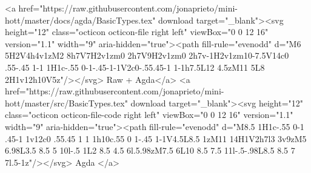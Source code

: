         <a href="https://raw.githubusercontent.com/jonaprieto/mini-hott/master/docs/agda/BasicTypes.tex" download target="_blank"><svg height="12" class="octicon octicon-file right left" viewBox="0 0 12 16" version="1.1" width="9" aria-hidden="true"><path fill-rule="evenodd" d="M6 5H2V4h4v1zM2 8h7V7H2v1zm0 2h7V9H2v1zm0 2h7v-1H2v1zm10-7.5V14c0 .55-.45 1-1 1H1c-.55 0-1-.45-1-1V2c0-.55.45-1 1-1h7.5L12 4.5zM11 5L8 2H1v12h10V5z"/></svg> Raw + Agda</a>
        <a href="https://raw.githubusercontent.com/jonaprieto/mini-hott/master/src/BasicTypes.tex" download target="_blank"><svg height="12" class="octicon octicon-file-code right left" viewBox="0 0 12 16" version="1.1" width="9" aria-hidden="true"><path fill-rule="evenodd" d="M8.5 1H1c-.55 0-1 .45-1 1v12c0 .55.45 1 1 1h10c.55 0 1-.45 1-1V4.5L8.5 1zM11 14H1V2h7l3 3v9zM5 6.98L3.5 8.5 5 10l-.5 1L2 8.5 4.5 6l.5.98zM7.5 6L10 8.5 7.5 11l-.5-.98L8.5 8.5 7 7l.5-1z"/></svg> Agda </a>
      
